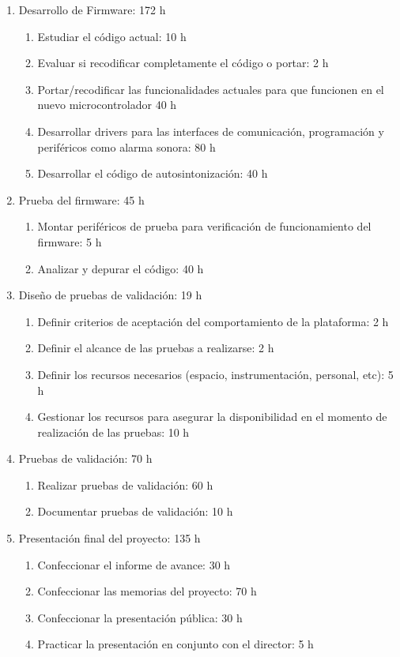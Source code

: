 \documentclass[
11pt, %
]{charter}
\begin{document}
\begin{enumerate}
\item Desarrollo de Firmware: 172 h
	\begin{enumerate}
	\item Estudiar el código actual: 10 h
	\item Evaluar si recodificar completamente el código o portar: 2 h
	\item Portar/recodificar las funcionalidades actuales para que funcionen en el nuevo microcontrolador 40 h
	\item Desarrollar drivers para las interfaces de comunicación, programación y periféricos como alarma sonora: 80 h
	\item Desarrollar el código de autosintonización: 40 h
	\end{enumerate}

\item Prueba del firmware: 45 h
    \begin{enumerate}
    \item Montar periféricos de prueba para verificación de funcionamiento del firmware: 5 h
    \item Analizar y depurar el código: 40 h
    \end{enumerate}

\item Diseño de pruebas de validación: 19 h
    \begin{enumerate}
    \item Definir criterios de aceptación del comportamiento de la plataforma: 2 h
    \item Definir el alcance de las pruebas a realizarse: 2 h
    \item Definir los recursos necesarios (espacio, instrumentación, personal, etc): 5 h
    \item Gestionar los recursos para asegurar la disponibilidad en el momento de realización de las pruebas: 10 h
    \end{enumerate}
    
\item Pruebas de validación: 70 h
    \begin{enumerate}
    \item Realizar pruebas de validación: 60 h
    \item Documentar pruebas de validación: 10 h
    \end{enumerate}
    
\item Presentación final del proyecto: 135 h
    \begin{enumerate}
    \item Confeccionar el informe de avance: 30 h
    \item Confeccionar las memorias del proyecto: 70 h
    \item Confeccionar la presentación pública: 30 h
    \item Practicar la presentación en conjunto con el director: 5 h
    \end{enumerate}

  
\end{enumerate}
\end{document}
